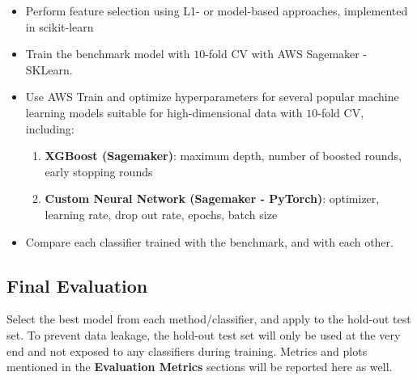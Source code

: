 \documentclass[11pt]{diazessay}
\begin{document}
\begin{itemize}
	\item Perform feature selection using L1- or model-based approaches, implemented in scikit-learn
	\item Train the benchmark model with $10$-fold CV with AWS Sagemaker - SKLearn.
	\item Use AWS Train and optimize hyperparameters for several popular machine learning models suitable for high-dimensional data with $10$-fold CV, including: 
	\begin{enumerate}
		\item \textbf{XGBoost (Sagemaker)}: maximum depth, number of boosted rounds, early stopping rounds
		\item \textbf{Custom Neural Network (Sagemaker - PyTorch)}: optimizer, learning rate, drop out rate, epochs, batch size
	\end{enumerate}
	\item Compare each classifier trained with the benchmark, and with each other.
\end{itemize} 

\subsection{Final Evaluation}

Select the best model from each method/classifier, and apply to the hold-out test set. To prevent data leakage, the hold-out test set will only be used at the very end and not exposed to any classifiers during training. Metrics and plots mentioned in the \textbf{Evaluation Metrics} sections will be reported here as well.

\vskip0.4in



\end{document}
